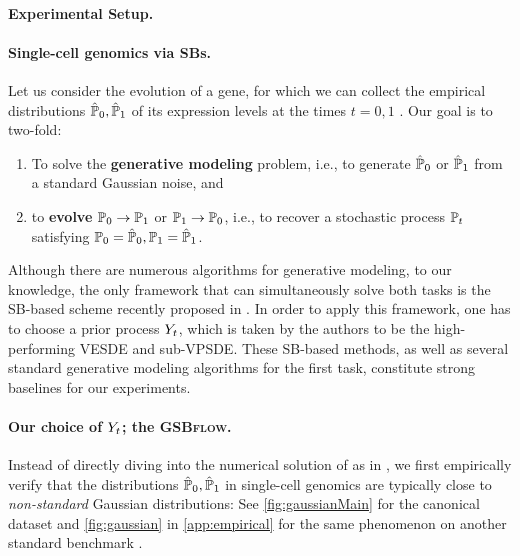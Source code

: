 \paragraph{Experimental Setup.}

\paragraph{Single-cell genomics via SBs.}
Let us consider the evolution of a gene, for which we can collect the empirical distributions $\hat{\mathbb{P}}_{ {0} },\hat{\mathbb{P}}_{ {1}}$ of its expression levels at the times $t=0,1$ \citep{schiebinger2019optimal,moon2019visualizing}. Our goal is to two-fold: 
\begin{enumerate}[itemsep=.0cm,topsep=0cm]
\item To solve the \textbf{generative modeling} problem, i.e., to generate $\hat{\mathbb{P}}_{ {0} }$ or $\hat{\mathbb{P}}_{ {1}}$ from a standard Gaussian noise, and
\item to \textbf{evolve} $\mathbb{P}_{{0}}\to\mathbb{P}_{{1}}$ or $\mathbb{P}_{{1}}\to\mathbb{P}_{{0}}$, i.e., to recover a stochastic process $\mathbb{P}_{{t}}$ satisfying $\mathbb{P}_{{0}} = \hat{\mathbb{P}}_{ {0} }, \mathbb{P}_{{1}} = \hat{\mathbb{P}}_{ {1}}$.
\end{enumerate}


Although there are numerous algorithms for generative modeling, to our knowledge, the only framework that can simultaneously solve both tasks is the \acrshort{SB}-based scheme recently proposed in \citep{chen2021likelihood}. In order to apply this framework, one has to choose a prior process $Y_{ t }$, which is taken by the authors to be the high-performing \acrshort{VESDE} and sub-\acrshort{VPSDE}. These \acrshort{SB}-based methods, as well as several standard generative modeling algorithms \citep{ho2020denoising, sohl2015deep, song2020score, huang2021variational, song2019generative, song2020score} for the first task, constitute strong baselines for our experiments.

\paragraph{Our choice of $Y_{ t }$; the \textsc{GSBflow}.}


Instead of directly diving into the numerical solution of  as in \citet{chen2021likelihood}, we first empirically verify that the distributions $\hat{\mathbb{P}}_{ {0} },\hat{\mathbb{P}}_{ {1}}$ in single-cell genomics are typically close to \emph{non-standard} Gaussian distributions: See \cref{fig:gaussianMain} for the canonical dataset \citep{schiebinger2019optimal} and \cref{fig:gaussian} in \cref{app:empirical} for the same phenomenon on another standard benchmark \citep{moon2019visualizing}. 

